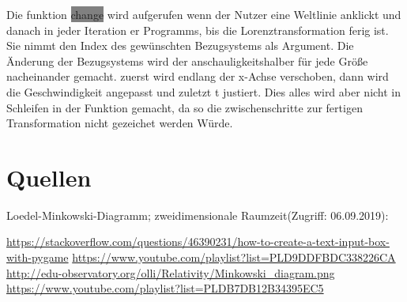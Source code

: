 \documentclass[12pt]{article}
\begin{document}
Die funktion \colorbox{gray}{change} wird aufgerufen wenn der Nutzer eine Weltlinie anklickt und danach in jeder Iteration er Programms, bis die Lorenztransformation ferig ist.
Sie nimmt den Index des gewünschten Bezugsystems als Argument.
Die Änderung der Bezugsystems wird der anschauligkeitshalber für jede Größe nacheinander gemacht.
zuerst wird endlang der x-Achse verschoben, dann wird die Geschwindigkeit angepasst und zuletzt t justiert.
Dies alles wird aber nicht in Schleifen in der Funktion gemacht, da so die zwischenschritte zur fertigen Transformation nicht gezeichet werden Würde.
\section{Quellen}
Loedel-Minkowski-Diagramm; zweidimensionale Raumzeit(Zugriff: 06.09.2019):

\url{https://stackoverflow.com/questions/46390231/how-to-create-a-text-input-box-with-pygame}
\url{https://www.youtube.com/playlist?list=PLD9DDFBDC338226CA}
\url{http://edu-observatory.org/olli/Relativity/Minkowski_diagram.png}
\url{https://www.youtube.com/playlist?list=PLDB7DB12B34395EC5}
\end{document}
